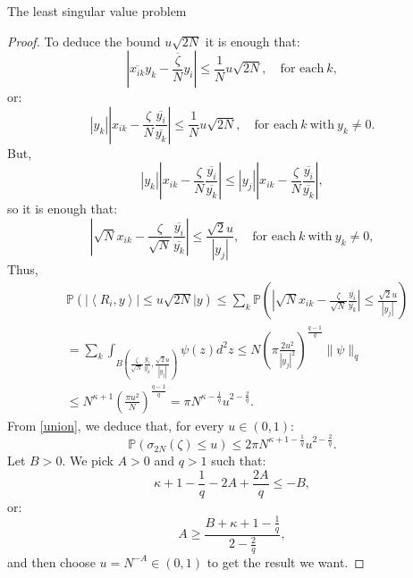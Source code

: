 \documentclass[11pt, a4paper, oneside]{book}
\numberwithin{equation}{chapter}
\newcommand{\beq}{\begin{equation}}
\newcommand{\eeq}{\end{equation}}
\begin{document}
\begin{section}{The least singular value problem}
\begin{proof}
     To deduce the bound $u \sqrt{2N}$ it is enough that:
     \begin{equation*}
     \left |\overline{x_{ik}}y_k - \frac{\overline{\zeta}}{N} y_i \right | \leq \frac{1}{N} u\sqrt{2N}, \quad \text{for each} \ k,
     \end{equation*}
     or:
    \begin{equation*}
    |y_k| \left |x_{ik} - \frac{\zeta}{N}\frac{\overline{y_i}}{\overline{y_k}} \right | \leq \frac{1}{N} u\sqrt{2N} ,  \quad \text{for each} \ k \ \text{with} \ y_k \neq 0.
    \end{equation*}
    But,
    \[
    |y_k| \left |x_{ik} - \frac{\zeta}{N}\frac{\overline{y_i}}{\overline{y_k}} \right | \leq |y_j| \left |x_{ik} - \frac{\zeta}{N}\frac{\overline{y_i}}{\overline{y_k}} \right |,
    \]
    so it is enough that:
    \beq \label{enough}
    \left |\sqrt{N}x_{ik} - \frac{\zeta}{\sqrt{N}}\frac{\overline{y_i}}{\overline{y_k}} \right | \leq \frac{\sqrt{2}u}{|y_j|} ,  \quad \text{for each} \ k \ \text{with} \ y_k \neq 0,
    \eeq
    Thus,
    \begin{align*}
        &\mathbb{P}\left(\left|\left\langle R_i, y\right\rangle \right| \leq u \sqrt{2N} \bigg | y \right ) \leq \sum \limits_k \mathbb{P}\left(\left| \sqrt{N}x_{ik} - \frac{\zeta}{\sqrt{N}}\frac{\overline{y_i}}{\overline{y_k}} \right| \leq \frac{\sqrt{2}u}{|y_j|}  \right ) \\ 
        &= \sum \limits_k \int_{B \left (\frac{\zeta}{\sqrt{N}}\frac{\overline{y_i}}{\overline{y_k}}, \frac{\sqrt{2}u}{|y_j|} \right )} \psi(z)  d^2z \leq N \left ( \pi \frac{2u^2}{|y_j|^2} \right )^{\frac{q-1}{q}} \| \psi \|_q \\
        &\leq N^{\kappa+1} \left ( \frac{\pi u^2}{N} \right )^{\frac{q-1}{q}} = \pi N^{\kappa - \frac{1}{q}} u^{2 - \frac{2}{q}}.
    \end{align*}
    From \eqref{union}, we deduce that, for every $u \in (0,1):$
    \begin{equation} \label{sing1}
        \mathbb{P} \left (\sigma_{2N}(\zeta) \leq u \right )  \leq 2\pi N^{\kappa + 1- \frac{1}{q}} u^{2 - \frac{2}{q}}.
    \end{equation}
    Let $B>0.$ We pick $A>0$ and $q>1$ such that:
    \[
    \kappa + 1 - \frac{1}{q} - 2A + \frac{2A}{q} \leq -B,
    \]
    or:
    \[
    A \geq \frac{B+\kappa+1-\frac{1}{q}}{2-\frac{2}{q}},
    \]
    and then choose $u = N^{-A} \in (0,1)$ to get the result we want.
\end{proof}
\end{section}
\end{document}
